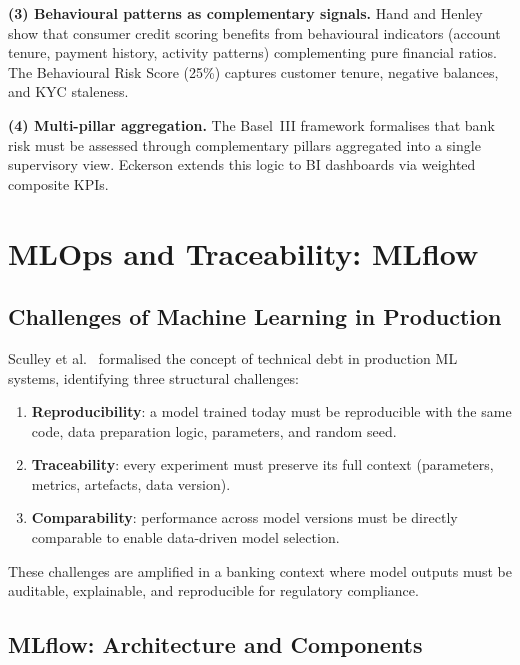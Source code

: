 \textbf{(3) Behavioural patterns as complementary signals.}
Hand and Henley \cite{hand1997} show that consumer credit scoring benefits from behavioural
indicators (account tenure, payment history, activity patterns) complementing pure financial
ratios. The Behavioural Risk Score (25\%) captures customer tenure, negative balances, and
KYC staleness.

\textbf{(4) Multi-pillar aggregation.}
The Basel~III framework \cite{bcbs2011} formalises that bank risk must be assessed through
complementary pillars aggregated into a single supervisory view. Eckerson \cite{eckerson2010}
extends this logic to BI dashboards via weighted composite KPIs.



\section{MLOps and Traceability: MLflow}

\subsection{Challenges of Machine Learning in Production}

Sculley et al.\ \cite{sculley2015} formalised the concept of technical debt in production
ML systems, identifying three structural challenges:

\begin{enumerate}
    \item \textbf{Reproducibility}: a model trained today must be reproducible with the
    same code, data preparation logic, parameters, and random seed.
    \item \textbf{Traceability}: every experiment must preserve its full context
    (parameters, metrics, artefacts, data version).
    \item \textbf{Comparability}: performance across model versions must be directly
    comparable to enable data-driven model selection.
\end{enumerate}

These challenges are amplified in a banking context where model outputs must be
auditable, explainable, and reproducible for regulatory compliance.

\subsection{MLflow: Architecture and Components}

